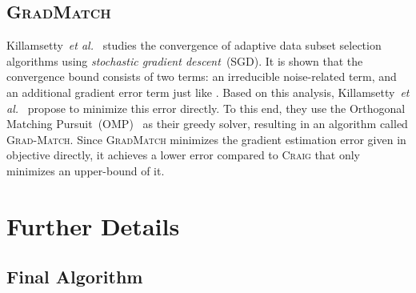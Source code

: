 \documentclass[runningheads]{llncs}
\newcommand{\etal}{\textit{et al.}}
\begin{document}
\subsection{\textsc{GradMatch}}\label{ap:sec:sec:gradmatch}
Killamsetty~\etal~\cite{killamsetty2021gradmatch} studies the convergence of adaptive data subset selection algorithms using \textit{stochastic gradient descent}~(SGD).
It is shown that the convergence bound consists of two terms: an irreducible noise-related term, and an additional gradient error term just like .
Based on this analysis, Killamsetty~\etal~\cite{killamsetty2021gradmatch} propose to minimize this error directly.
To this end, they use the Orthogonal Matching Pursuit~(OMP)~\cite{pati1992omp,elenberg2016restricted} as their greedy solver, resulting in an algorithm called \textsc{Grad-Match}.
Since \textsc{GradMatch} minimizes the gradient estimation error given in  objective directly, it achieves a lower error compared to \textsc{Craig} that only minimizes an upper-bound of it.

\section{Further Details}
\subsection{Final Algorithm}\label{ap:final_alg}
\end{document}
